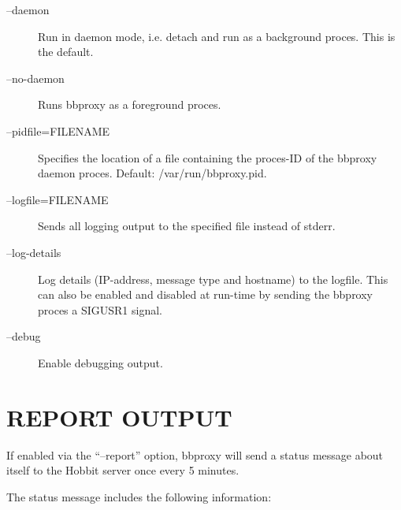 \begin{description}
 

\item[--daemon] Run in daemon mode, i.e. detach and run as a background proces. This is the default. 

 

\item[--no-daemon] Runs bbproxy as a foreground proces. 

 

\item[--pidfile=FILENAME] Specifies the location of a file containing the proces-ID of the bbproxy daemon proces. Default: /var/run/bbproxy.pid. 

 

\item[--logfile=FILENAME] Sends all logging output to the specified file instead of stderr. 

 

\item[--log-details] Log details (IP-address, message type and hostname) to the logfile. This can also be enabled and disabled at run-time by sending the bbproxy proces a SIGUSR1 signal. 

 

\item[--debug] Enable debugging output. 

 


\end{description}
\section{REPORT OUTPUT}
 If enabled via the ``--report'' option, bbproxy will send a status message about itself to the Hobbit server once every 5 minutes. 

  The status message includes the following information: 


